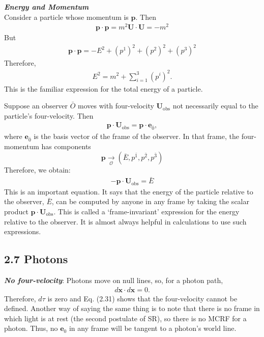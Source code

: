 \documentclass[12pt]{book}
\begin{document}
    \textit{\textbf{Energy and Momentum}}\\
        Consider a particle whose momentum is \( \mathbf{p} \). Then
        \begin{align}
        \mathbf{p} \cdot \mathbf{p} = m^2 \mathbf{U} \cdot \mathbf{U} = -m^2
        \end{align}
        But
        \begin{align}
        \mathbf{p} \cdot \mathbf{p} = -E^2 + (p^1)^2 + (p^2)^2 + (p^3)^2
        \end{align}
        Therefore,
        \begin{align}
        E^2 = m^2 + \sum_{i=1}^{3} (p^i)^2.
        \end{align}
        This is the familiar expression for the total energy of a particle.
        
        Suppose an observer \( \bar{O} \) moves with four-velocity \( \mathbf{U}_{\text{obs}} \) not necessarily equal to the particle’s four-velocity. Then
        \begin{align}
        \mathbf{p} \cdot \mathbf{U}_{\text{obs}} = \mathbf{p} \cdot \mathbf{e}_{\bar{0}},
        \end{align}
        where \( \mathbf{e}_{\bar{0}} \) is the basis vector of the frame of the observer. In that frame, the four-momentum has components
        \[
        \mathbf{p} \underset{\mathcal{O}}{\rightarrow} (\bar{E}, p^{\bar{1}}, p^{\bar{2}}, p^{\bar{3}})
        \]
        Therefore, we obtain:
        \begin{align}
        - \mathbf{p} \cdot \mathbf{U}_{\text{obs}} = \bar{E}
        \end{align}
        This is an important equation. It says that the energy of the particle relative to the observer, \( \bar{E} \), can be computed by anyone in any frame by taking the scalar product \( \mathbf{p} \cdot \mathbf{U}_{\text{obs}} \). This is called a ‘frame-invariant’ expression for the energy relative to the observer. It is almost always helpful in calculations to use such expressions.\\

    \subsection{2.7 Photons }

        \textit{\textbf{No four-velocity}}: Photons move on null lines, so, for a photon path,
        \begin{align}
        d\mathbf{x} \cdot d\mathbf{x} = 0.
        \end{align}
        Therefore, \( d\tau \) is zero and Eq. (2.31) shows that the four-velocity cannot be defined. Another way of saying the same thing is to note that there is no frame in which light is at rest (the second postulate of SR), so there is no MCRF for a photon. Thus, no \( \mathbf{e}_0 \) in any frame will be tangent to a photon’s world line.
        
\end{document}
